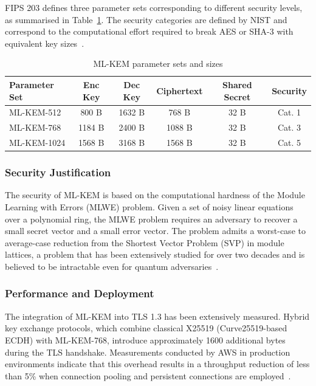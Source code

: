 \documentclass[12pt,a4paper]{article}
\begin{document}
FIPS 203 defines three parameter sets corresponding to different security levels, as summarised in Table~\ref{tab:mlkem-params}. The security categories are defined by NIST and correspond to the computational effort required to break AES or SHA-3 with equivalent key sizes~\cite{nist-fips-203-2024}.

\begin{table}[htbp]
\centering
\caption{ML-KEM parameter sets and sizes}
\label{tab:mlkem-params}
\begin{tabular}{lccccc}
\toprule
\textbf{Parameter Set} & \textbf{Enc Key} & \textbf{Dec Key} & \textbf{Ciphertext} & \textbf{Shared Secret} & \textbf{Security} \\
\midrule
ML-KEM-512  & 800 B  & 1632 B & 768 B  & 32 B & Cat. 1 \\
ML-KEM-768  & 1184 B & 2400 B & 1088 B & 32 B & Cat. 3 \\
ML-KEM-1024 & 1568 B & 3168 B & 1568 B & 32 B & Cat. 5 \\
\bottomrule
\end{tabular}
\end{table}

\subsubsection{Security Justification}

The security of ML-KEM is based on the computational hardness of the Module Learning with Errors (MLWE) problem. Given a set of noisy linear equations over a polynomial ring, the MLWE problem requires an adversary to recover a small secret vector and a small error vector. The problem admits a worst-case to average-case reduction from the Shortest Vector Problem (SVP) in module lattices, a problem that has been extensively studied for over two decades and is believed to be intractable even for quantum adversaries~\cite{nist-fips-203-2024,regev2009-lwe}.

\subsubsection{Performance and Deployment}

The integration of ML-KEM into TLS 1.3 has been extensively measured. Hybrid key exchange protocols, which combine classical X25519 (Curve25519-based ECDH) with ML-KEM-768, introduce approximately 1600 additional bytes during the TLS handshake. Measurements conducted by AWS in production environments indicate that this overhead results in a throughput reduction of less than 5\% when connection pooling and persistent connections are employed~\cite{aws-mlkem-tls-performance-2024,kampanakis-pqtls-impact-2024}.
\end{document}
